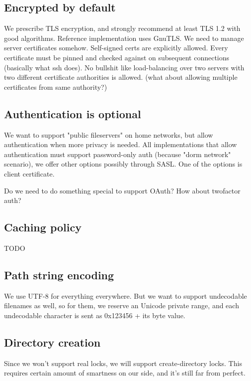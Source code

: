\subsection{Encrypted by default}

We prescribe TLS encryption, and strongly recommend at least TLS 1.2 with good algorithms. Reference
implementation uses GnuTLS. We need to manage server certificates somehow. Self-signed certs are explicitly
allowed. Every certificate must be pinned and checked against on subsequent connections (basically what ssh
does). No bullshit like load-balancing over two servers with two different certificate authorities is allowed.
(what about allowing multiple certificates from same authority?)

\subsection{Authentication is optional}

We want to support "public fileservers" on home networks, but allow authentication when more privacy is
needed. All implementations that allow authentication must support password-only auth (because "dorm network"
scenario), we offer other options possibly through SASL. One of the options is client certificate.

Do we need to do something special to support OAuth? How about twofactor auth?

\subsection{Caching policy}

TODO

\subsection{Path string encoding}

We use UTF-8 for everything everywhere. But we want to support undecodable filenames as well, so for them, we
reserve an Unicode private range, and each undecodable character is sent as 0x123456 + its byte value.

\subsection{Directory creation}

Since we won't support real locks, we will support create-directory locks. This requires certain amount of
smartness on our side, and it's still far from perfect.

